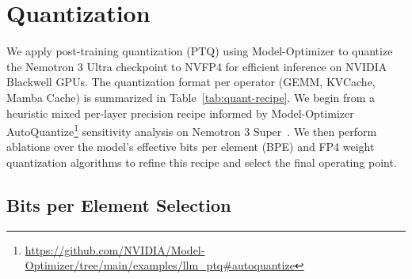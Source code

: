 \section{Quantization}
\label{sec:quantization}

We apply post-training quantization (PTQ) using Model-Optimizer to quantize the Nemotron 3 Ultra checkpoint to NVFP4 \citep{nvpfp4_ptq_default} for efficient inference on NVIDIA Blackwell GPUs.
The quantization format per operator (GEMM, KVCache, Mamba Cache) is summarized in Table~\ref{tab:quant-recipe}. We begin from a heuristic mixed per-layer precision recipe informed by
Model-Optimizer AutoQuantize\footnote{\url{https://github.com/NVIDIA/Model-Optimizer/tree/main/examples/llm_ptq\#autoquantize}}
sensitivity analysis on Nemotron 3 Super~\citep{nvidia2026nemotron3superopen}.
We then perform ablations over the model's effective
bits per element (BPE) and FP4 weight quantization algorithms to refine this
recipe and select the final operating point.

\begin{table}[!htp]
\centering
\small
\setlength{\tabcolsep}{8pt}
\renewcommand{\arraystretch}{1.3}
\caption{
Quantization recipe for \ourmodel, mapping each layer or operator
from its BF16 baseline.
}
\label{tab:quant-recipe}
\end{table}


\subsection{Bits per Element Selection}
\label{sec:bpe-sweep}

